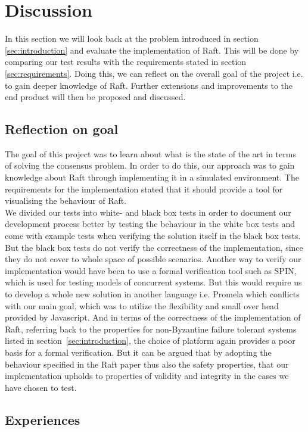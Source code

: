 \section{Discussion} %
\label{sec:discussion}
In this section we will look back at the problem introduced in section \ref{sec:introduction} and evaluate the implementation of Raft. This will be done by comparing our test results with the requirements stated in section \ref{sec:requirements}. Doing this, we can reflect on the overall goal of the project i.e. to gain deeper knowledge of Raft. Further extensions and improvements to the end product will then be proposed and discussed.

\subsection{Reflection on goal}
The goal of this project was to learn about what is the state of the art in terms of solving the consensus problem. In order to do this, our approach was to gain knowledge about Raft through implementing it in a simulated environment. 
The requirements for the implementation stated that it should provide a tool for visualising the behaviour of Raft. \\
We divided our tests into white- and black box tests in order to document our development process better by testing the behaviour in the white box tests and come with example tests when verifying the solution itself in the black box tests. But the black box tests do not verify the correctness of the implementation, since they do not cover to whole space of possible scenarios. Another way to verify our implementation would have been to use a formal verification tool such as SPIN, which is used for testing models of concurrent systems. But this would require us to develop a whole new solution in another language i.e. Promela which conflicts with our main goal, which was to utilize the flexibility and small over head provided by Javascript. And in terms of the correctness of the implementation of Raft, referring back to the properties for non-Byzantine failure tolerant systems listed in section~\ref{sec:introduction}, the choice of platform again provides a poor basis for a formal verification. But it can be argued that by adopting the behaviour specified in the Raft paper thus also the safety properties, that our implementation upholds to properties of validity and integrity in the cases we have chosen to test.

\subsection{Experiences}


